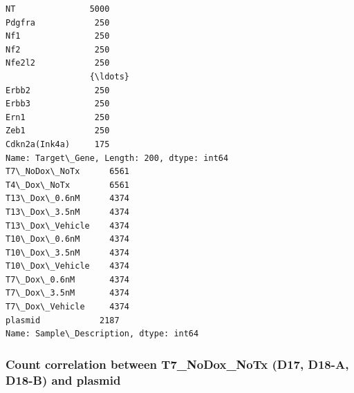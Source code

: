 \documentclass[11pt]{article}
\begin{document}
    
    \begin{Verbatim}[commandchars=\\\{\}]
NT               5000
Pdgfra            250
Nf1               250
Nf2               250
Nfe2l2            250
                 {\ldots}
Erbb2             250
Erbb3             250
Ern1              250
Zeb1              250
Cdkn2a(Ink4a)     175
Name: Target\_Gene, Length: 200, dtype: int64
T7\_NoDox\_NoTx      6561
T4\_Dox\_NoTx        6561
T13\_Dox\_0.6nM      4374
T13\_Dox\_3.5nM      4374
T13\_Dox\_Vehicle    4374
T10\_Dox\_0.6nM      4374
T10\_Dox\_3.5nM      4374
T10\_Dox\_Vehicle    4374
T7\_Dox\_0.6nM       4374
T7\_Dox\_3.5nM       4374
T7\_Dox\_Vehicle     4374
plasmid            2187
Name: Sample\_Description, dtype: int64
    \end{Verbatim}

    \subsubsection{Count correlation between T7\_NoDox\_NoTx (D17, D18-A,
D18-B) and
plasmid}\label{count-correlation-between-t7_nodox_notx-d17-d18-a-d18-b-and-plasmid}
\end{document}
